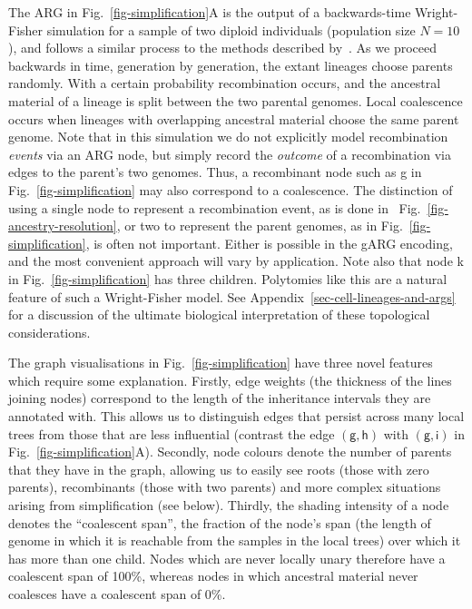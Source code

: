 \documentclass{article}
\newcommand{\noderef}[1]{\textsf{#1}}
\begin{document}
The ARG in Fig.~\ref{fig-simplification}A is the output of a
backwards-time Wright-Fisher simulation for a sample of two diploid
individuals (population size $N=10$), and follows a similar process
to the methods described by~\cite{nelson2020accounting}.
As we proceed backwards in time, generation by generation, the
extant lineages choose parents randomly.
With a certain probability recombination occurs, and the ancestral
material of a lineage is split between the two parental
genomes. Local coalescence occurs
when lineages with overlapping ancestral material choose the same
parent genome.
Note that in this simulation we do not explicitly
model recombination \emph{events} via an ARG node, but simply record
the \emph{outcome} of a recombination via edges to
the parent's two genomes.
Thus, a recombinant node such as \noderef{g} in Fig.~\ref{fig-simplification}
may also correspond to a coalescence.
The distinction of
using a single node to represent
a recombination event, as is done in ~Fig.~\ref{fig-ancestry-resolution},
or two to represent the parent genomes, as in Fig.~\ref{fig-simplification},  
is often not important.
Either is possible in the gARG encoding, and 
the most convenient approach will vary by application.
Note also that node \noderef{k} in Fig.~\ref{fig-simplification} has three children.
Polytomies like this are a natural feature of such a Wright-Fisher model.
See Appendix~\ref{sec-cell-lineages-and-args} for a discussion of the 
ultimate biological interpretation of these topological considerations.

The graph visualisations in Fig.~\ref{fig-simplification} have
three novel features which require some explanation.
Firstly, edge weights (the thickness of the lines joining
nodes) correspond to the length of the inheritance intervals
they are annotated with. This allows us to distinguish
edges that persist across many local trees from those that are
less influential (contrast the edge
$(\noderef{g}, \noderef{h})$
with $(\noderef{g}, \noderef{i})$
in Fig.~\ref{fig-simplification}A).
Secondly, node colours denote the number of parents that they
have in the graph, allowing us to easily see roots (those
with zero parents), recombinants (those with two parents)
and more complex situations arising from simplification (see below).
Thirdly, the shading intensity of a node denotes the ``coalescent span'', the
fraction of the node's span (the length of genome in which it
is reachable from the samples in the local trees)
over which it has more than one child. Nodes which
are never locally unary therefore have a coalescent span of 100\%,
whereas nodes in which ancestral material never coalesces have a
coalescent span of 0\%.
\end{document}
